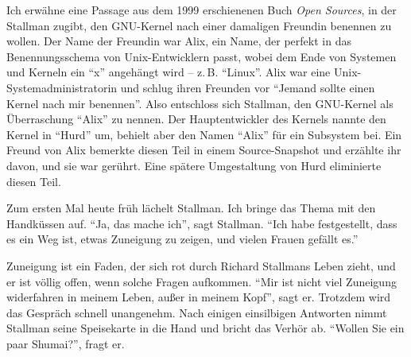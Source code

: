 Ich erwähne eine Passage aus dem 1999 erschienenen Buch \textit{Open Sources}, in der Stallman zugibt, den GNU-Kernel nach einer damaligen Freundin benennen zu wollen. Der Name der Freundin war Alix, ein Name, der perfekt in das Benennungsschema von Unix-Entwicklern passt, wobei dem Ende von Systemen und Kerneln ein "`x"' angehängt wird – z.\,B. "`Linux"'. Alix war eine Unix-Systemadministratorin und schlug ihren Freunden vor "`Jemand sollte einen Kernel nach mir benennen"'. Also entschloss sich Stallman, den GNU-Kernel als Überraschung "`Alix"' zu nennen. Der Hauptentwickler des Kernels nannte den Kernel in "`Hurd"' um, behielt aber den Namen "`Alix"' für ein Subsystem bei. Ein Freund von Alix bemerkte diesen Teil in einem Source-Snapshot und erzählte ihr davon, und sie war gerührt. Eine spätere Umgestaltung von Hurd eliminierte diesen Teil. 

Zum ersten Mal heute früh lächelt Stallman. Ich bringe das Thema mit den Handküssen auf. "`Ja, das mache ich"', sagt Stallman. "`Ich habe festgestellt, dass es ein Weg ist, etwas Zuneigung zu zeigen, und vielen Frauen gefällt es."'

Zuneigung ist ein Faden, der sich rot durch Richard Stallmans Leben zieht, und er ist völlig offen, wenn solche Fragen aufkommen. "`Mir ist nicht viel Zuneigung widerfahren in meinem Leben, außer in meinem Kopf"', sagt er. Trotzdem wird das Gespräch schnell unangenehm. Nach einigen einsilbigen Antworten nimmt Stallman seine Speisekarte in die Hand und bricht das Verhör ab.
"`Wollen Sie ein paar Shumai?"', fragt er.

